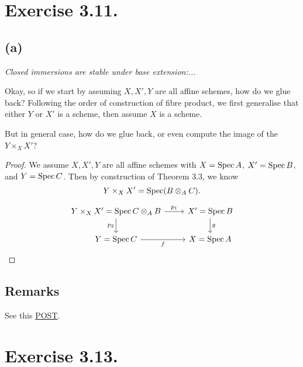 \section{Exercise 3.11.}

\subsection{(a)}
\textit{Closed immersions are stable under base extension:...}

Okay, so if we start by assuming $X,X',Y$ are all affine schemes, how do we glue back? Following the order of construction of fibre product, we first generalise that either $Y$ or $X'$ is a scheme, then assume $X$ is a scheme. 

But in general case, how do we glue back, or even compute the image of the $Y\times_{X}X'$?

\begin{proof}
    We assume $X,X',Y$ are all affine schemes with $X=\operatorname{Spec} A$, $X'=\operatorname{Spec} B$, and $Y=\operatorname{Spec} C$. Then by construction of Theorem 3.3, we know 
    \[Y\times_{X}X'=\operatorname{Spec} (B\otimes_A C).\]

\[\begin{tikzcd}
	{Y\times_{X}X'=\operatorname{Spec} C\otimes_{A}B} & {X'=\operatorname{Spec} B} \\
	{Y=\operatorname{Spec} C} & {X=\operatorname{Spec} A}
	\arrow["{p_1}", from=1-1, to=1-2]
	\arrow["{p_2}"', from=1-1, to=2-1]
	\arrow["g", from=1-2, to=2-2]
	\arrow["f"', from=2-1, to=2-2]
\end{tikzcd}\]

\end{proof}

\subsection{Remarks}

See this \href{https://math.stackexchange.com/questions/1079356/closed-immersions-are-stable-under-base-change}{POST}.

\section{Exercise 3.13.}

